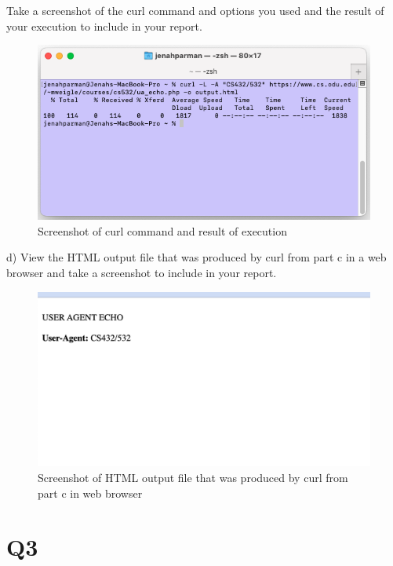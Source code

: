 \documentclass[12pt]{article}
\begin{document}
Take a screenshot of the curl command and options you used and the result of your execution to include in your report.

\begin{figure}[!ht]
    \centering
    \includegraphics[width=0.5\linewidth]{q2_3.png}
    \caption{Screenshot of curl command and result of execution}
    \label{fig:q2_3}
\end{figure}

d) View the HTML output file that was produced by curl from part c in a web browser and take a screenshot to include in your report.

\begin{figure}[!ht]
    \centering
    \includegraphics[width=0.5\linewidth]{q2_4.png}
    \caption{Screenshot of HTML output file that was produced by curl from part c in web browser}
    \label{fig:q2_4}
\end{figure}



\section*{Q3}
\end{document}
